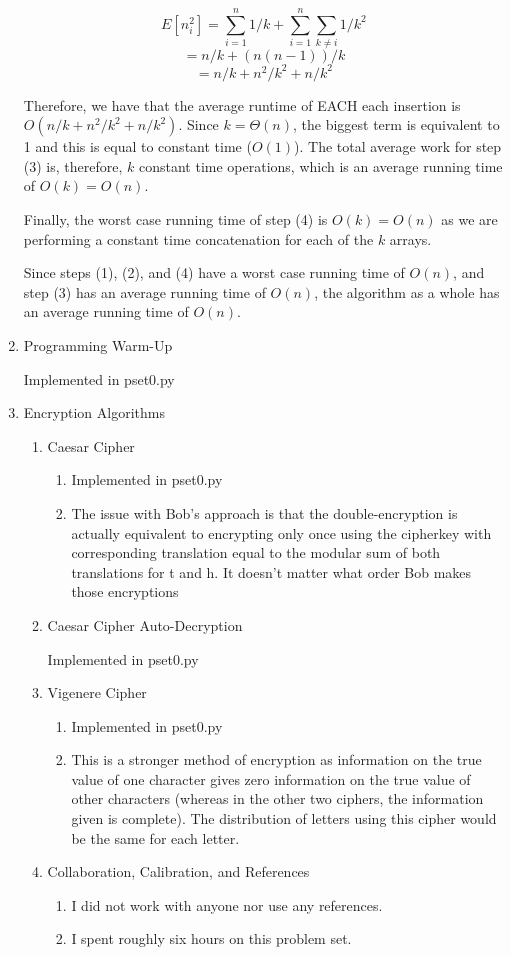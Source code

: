 \documentclass[submit]{harvardml}
\begin{document}
\begin{enumerate}
    $$E[n_i^2] = \sum_{i=1}^n 1/k + \sum_{i=1}^n \sum_{k\neq i} 1/k^2 $$
    $$ = n/k + (n(n-1))/k $$
    $$ = n/k + n^2/k^2 + n/k^2$$

    Therefore, we have that the average runtime of EACH each insertion is 
    $O(n/k + n^2/k^2 + n/k^2)$. Since $k = \Theta(n)$, the biggest term is equivalent to 1 and
    this is equal to constant time ($O(1)$). The total average work for step (3) is, therefore,
    $k$ constant time operations, which is an average running time of $O(k) = O(n)$.

    Finally, the worst case running time of step (4) is $O(k) = O(n)$ as we are performing a 
    constant time concatenation for each of the $k$ arrays.

    Since steps (1), (2), and (4) have a worst case running time of $O(n)$, and step (3) has an
    average running time of $O(n)$, the algorithm as a whole has an average running time of $O(n)$.


    \item Programming Warm-Up

    Implemented in pset0.py

    \item Encryption Algorithms
    \begin{enumerate}
      \item Caesar Cipher
      \begin{enumerate}
        \item Implemented in pset0.py 
        \item The issue with Bob's approach is that the double-encryption is actually equivalent to 
        encrypting only once using the cipherkey with corresponding translation equal to the 
        modular sum of both translations for t and h. It doesn't matter what order Bob makes those 
        encryptions      
      \end{enumerate}

      \item Caesar Cipher Auto-Decryption

      Implemented in pset0.py

      \item Vigenere Cipher
      \begin{enumerate}
        \item Implemented in pset0.py
        \item This is a stronger method of encryption as information on the true value of one 
        character gives zero information on the true value of other characters (whereas in the 
        other two ciphers, the information given is complete). The distribution of letters
        using this cipher would be the same for each letter.
      \end{enumerate}

    \item Collaboration, Calibration, and References
    \begin{enumerate}
      \item I did not work with anyone nor use any references.
      \item I spent roughly six hours on this problem set.
    \end{enumerate}
    \end{enumerate}
  \end{enumerate}
\end{document}
